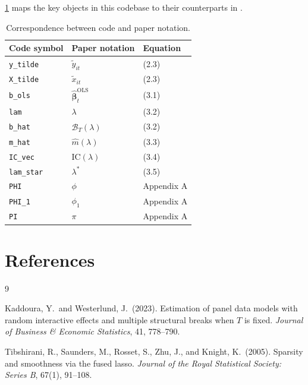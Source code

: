 \documentclass[12pt, a4paper]{article}
\theoremstyle{plain}
\theoremstyle{definition}
\theoremstyle{remark}
\newcommand{\bB}{\mathcal{B}}
\newcommand{\bbeta}{\bm{\beta}}
\begin{document}
\begin{onehalfspacing}
\cref{tab:code_paper} maps the key objects in this codebase to their
counterparts in \citet{kaddoura2023estimation}.

\begin{table}[htb]
  \centering
  \caption{Correspondence between code and paper notation.}
  \label{tab:code_paper}
  \begin{tabular}{lll}
    \toprule
    Code symbol & Paper notation & Equation \\
    \midrule
    \texttt{y\_tilde} & $\tilde{y}_{it}$ & (2.3) \\
    \texttt{X\_tilde} & $\tilde{x}_{it}$ & (2.3) \\
    \texttt{b\_ols}   & $\hat{\bbeta}_t^{\text{OLS}}$ & (3.1) \\
    \texttt{lam}      & $\lambda$ & (3.2) \\
    \texttt{b\_hat}   & $\hat{\bB}_T(\lambda)$ & (3.2) \\
    \texttt{m\_hat}   & $\hat{m}(\lambda)$ & (3.3) \\
    \texttt{IC\_vec}  & $\text{IC}(\lambda)$ & (3.4) \\
    \texttt{lam\_star}& $\lambda^*$ & (3.5) \\
    \texttt{PHI}      & $\phi$   & Appendix A \\
    \texttt{PHI\_1}   & $\phi_1$ & Appendix A \\
    \texttt{PI}       & $\pi$    & Appendix A \\
    \bottomrule
  \end{tabular}
\end{table}

\section*{References}

\begin{thebibliography}{9}

Kaddoura, Y.\ and Westerlund, J.\ (2023).
\newblock Estimation of panel data models with random interactive effects and
  multiple structural breaks when $T$ is fixed.
\newblock \emph{Journal of Business \& Economic Statistics}, 41, 778--790.

Tibshirani, R., Saunders, M., Rosset, S., Zhu, J., and Knight, K.\ (2005).
\newblock Sparsity and smoothness via the fused lasso.
\newblock \emph{Journal of the Royal Statistical Society: Series B}, 67(1),
  91--108.


\end{thebibliography}
\end{onehalfspacing}
\end{document}
